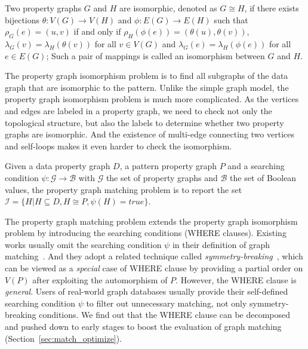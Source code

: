 \begin{definition}
  Two property graphs $G$ and $H$ are isomorphic, denoted as $G \cong H$,
  if there exists bijections $\theta: V(G) \rightarrow V(H)$ and $\phi: E(G) \rightarrow E(H)$ such that
  $\rho_G(e) = (u, v)$ if and only if $\rho_H(\phi(e)) = (\theta(u), \theta(v))$,
  $\lambda_G(v) = \lambda_H(\theta(v))$ for all $v \in V(G)$
  and $\lambda_G(e) = \lambda_H(\phi(e))$ for all $e \in E(G)$;
  Such a pair of mappings is called an isomorphism between $G$ and $H$.
\end{definition}
The property graph isomorphism problem is to find all subgraphs of the data graph that are isomorphic to the pattern.
Unlike the simple graph model, the property graph isomorphism problem is much more complicated.
As the vertices and edges are labeled in a property graph, we need to check  not only the topological structure,
but also the labels to determine whether two property graphs are isomorphic.
And the existence of multi-edge connecting two vertices and self-loops makes it even harder to check the isomorphism.
\begin{definition}\label{def:property_graph_matching}
  Given a data property graph $D$, a pattern property graph $P$ and a searching condition $\psi: \mathcal{G} \rightarrow \mathcal{B}$ with $\mathcal{G}$ the set of property graphs and $\mathcal{B}$ the set of Boolean values,
  the property graph matching problem is to report the set $\mathcal{I} = \{H | H \subseteq D, H \cong P, \psi(H) = true\}$.
\end{definition}
The property graph matching problem extends the property graph isomorphism problem by introducing the searching conditions (WHERE clauses).
Existing works usually omit the searching condition $\psi$ in their definition of graph matching~\cite{DBLP:conf/sigmod/ShaoCCMYX14,DBLP:journals/pvldb/LaiQLC15,DBLP:conf/sigmod/KimLBHLKJ16,DBLP:journals/pvldb/QiaoZC17}.
And they adopt a related technique called \emph{symmetry-breaking}~\cite{DBLP:conf/recomb/GrochowK07},
which can be viewed as a \emph{special} case of WHERE clause by providing a partial order on $V(P)$ after exploiting the automorphism of $P$.
However, the WHERE clause is \emph{general}. Users of real-world graph databases usually provide their self-defined searching condition $\psi$ to filter out unnecessary matching, not only symmetry-breaking conditions.
We find out that the WHERE clause can be decomposed and pushed down to early stages to boost the evaluation of graph matching (Section~\ref{sec:match_optimize}).
